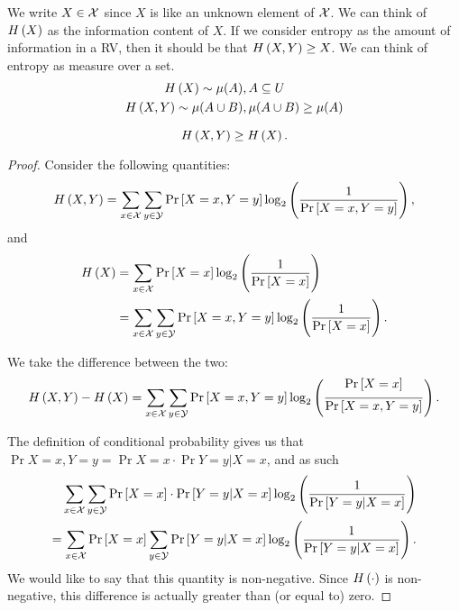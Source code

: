 We write $X \in \mathcal{X}$ since $X$ is like an unknown element of $\mathcal{X}$.
We can think of $H\left({X}\right)$ as the information content of $X$.
If we consider entropy as the amount of information in a \ac{RV}, then it should be that $H\left({X,Y}\right) \ge X$.
We can think of entropy as  measure over a set.
\begin{align*}
	H\left({X}\right) \sim \mu(A), & \, A \subseteq U
	\\
	H\left({X,Y}\right) \sim \mu(A \cup B), & \, \mu(A \cup B) \geq \mu(A)
\end{align*}

\begin{prop}
	\begin{equation*}
		H\left({X,Y}\right) \ge H\left({X}\right).   
	\end{equation*}
\end{prop}

\begin{proof}
	Consider the following quantities:
	\begin{equation*}
		H\left({X,Y}\right)
		=
		\sum_{x \in \mathcal{X}} \sum_{y \in \mathcal{Y}} \mathop{\mathrm{Pr}}\limits_{} \left[ {X = x, Y = y} \right]
		\log_2 \left( \frac{1}{\mathop{\mathrm{Pr}}\limits_{} \left[ {X = x, Y = y} \right]} \right),
	\end{equation*}
	and
	\begin{align*}
		H\left({X}\right)
		& =
		\sum_{x \in \mathcal{X}} \mathop{\mathrm{Pr}}\limits_{} \left[ {X = x} \right] \log_2 \left( \frac{1}{\mathop{\mathrm{Pr}}\limits_{} \left[ {X=x} \right]} \right)
		\\
		& =
		\sum_{x \in \mathcal{X}} \sum_{y \in \mathcal{Y}} \mathop{\mathrm{Pr}}\limits_{} \left[ {X = x, Y = y} \right]
		\log_2 \left( \frac{1}{\mathop{\mathrm{Pr}}\limits_{} \left[ {X = x} \right]} \right).
	\end{align*} 

	We take the difference between the two:
	\begin{equation*}
		H\left({X,Y}\right) - H\left({X}\right)
		=
		\sum_{x \in \mathcal{X}} \sum_{y \in \mathcal{Y}}
		\mathop{\mathrm{Pr}}\limits_{} \left[ {X = x, Y = y} \right]
		\log_2 \left( \frac{\mathop{\mathrm{Pr}}\limits_{} \left[ {X = x} \right]}{\mathop{\mathrm{Pr}}\limits_{} \left[ {X = x, Y = y} \right]} \right).
	\end{equation*}

	The definition of conditional probability gives us that $\Pr{X = x, Y = y} = \Pr{X = x} \cdot \Pr{Y = y | X = x}$, and as such
	\begin{align*}
		\sum_{x \in \mathcal{X}} \sum_{y \in \mathcal{Y}} \mathop{\mathrm{Pr}}\limits_{} \left[ {X = x} \right] \cdot \mathop{\mathrm{Pr}}\limits_{} \left[ {Y = y | X = x} \right]
		\log_2 \left( \frac{1}{\mathop{\mathrm{Pr}}\limits_{} \left[ {Y = y | X = x} \right]} \right)
		\\
		=
		\sum_{x \in \mathcal{X}} \mathop{\mathrm{Pr}}\limits_{} \left[ {X = x} \right] \sum_{y \in \mathcal{Y}} \mathop{\mathrm{Pr}}\limits_{} \left[ {Y = y | X = x} \right]
		\log_2 \left( \frac{1}{\mathop{\mathrm{Pr}}\limits_{} \left[ {Y = y | X = x} \right]} \right).
	\end{align*}
	We would like to say that this quantity is non-negative.
	Since $H\left({\cdot}\right)$ is non-negative, this difference is actually greater than (or equal to) zero.
\end{proof}


